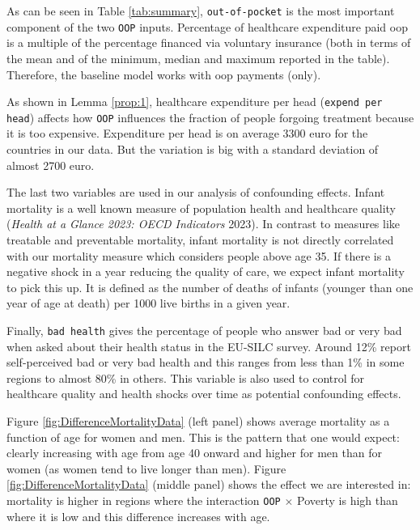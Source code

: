 \documentclass[a4paper,12pt]{article}
\makeatletter
\newcommand{\citeprocitem}[2]{\hyper@linkstart{cite}{citeproc_bib_item_#1}#2\hyper@linkend}
\makeatother
\begin{document}
As can be seen in Table \ref{tab:summary}, \texttt{out-of-pocket} is the most important component of the two \texttt{OOP} inputs. Percentage of healthcare expenditure paid oop is a multiple of the percentage financed via voluntary insurance (both in terms of the mean and of the minimum, median and maximum reported in the table). Therefore, the baseline model works with oop payments (only).

As shown in Lemma \ref{prop:1}, healthcare expenditure per head (\texttt{expend per head}) affects how \texttt{OOP} influences the fraction of people forgoing treatment because it is too expensive. Expenditure per head is on average 3300 euro for the countries in our data. But the variation is big with a standard deviation of almost 2700 euro.

The last two variables are used in our analysis of confounding effects. Infant mortality is a well known measure of population health and healthcare quality (\citeprocitem{13}{\textit{Health at a Glance 2023: OECD Indicators} 2023}). In contrast to measures like treatable and preventable mortality, infant mortality is not directly correlated with our mortality measure which considers people above age 35. If there is a negative shock in a year reducing the quality of care, we expect infant mortality to pick this up. It is defined as the number of deaths of infants (younger than one year of age at death) per 1000 live births in a given year.

Finally, \texttt{bad health} gives the percentage of people who answer bad or very bad when asked about their health status in the EU-SILC survey. Around 12\% report self-perceived bad or very bad health and this ranges from less than 1\% in some regions to almost 80\% in others. This variable is also used to control for healthcare quality and health shocks over time as potential confounding effects.


Figure \ref{fig:DifferenceMortalityData} (left panel) shows average mortality as a function of age for women and men. This is the pattern that one would expect: clearly increasing with age from age 40 onward and higher for men than for women (as women tend to live longer than men). Figure \ref{fig:DifferenceMortalityData} (middle panel) shows the effect we are interested in: mortality is higher in regions where the interaction \texttt{OOP} \(\times\) Poverty is high than where it is low and this difference increases with age. 
\end{document}
